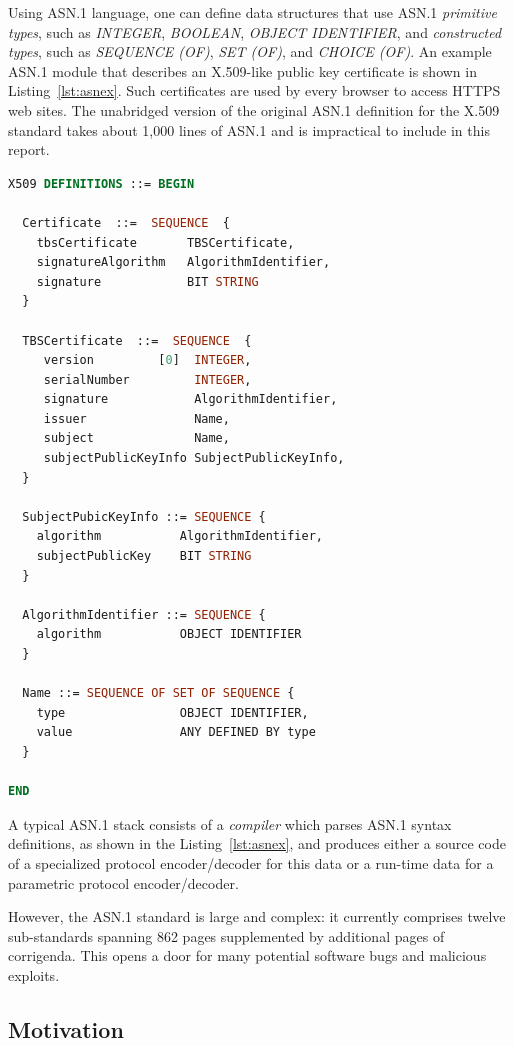 \documentclass[acmsmall,nonacm]{acmart}
\begin{document}
Using ASN.1 language, one can define data structures that use
ASN.1 {\it primitive types}, such as \emph{INTEGER}, \emph{BOOLEAN}, \emph{OBJECT
IDENTIFIER}, and {\it constructed types}, such as \emph{SEQUENCE (OF)},
\emph{SET (OF)}, and \emph{CHOICE (OF)}. An example ASN.1 module that describes an X.509-like public key
certificate is shown in Listing~\ref{lst:asnex}. Such certificates are
used by every browser to access HTTPS web sites. The unabridged
version of the original ASN.1 definition for the X.509 standard takes
about 1,000 lines of ASN.1 and is impractical to include in this
report. 

\begin{lstlisting}[language=ASN1,label=lst:asnex,
  caption={ASN.1 example of X.509 certificates, revised for brevity}]
X509 DEFINITIONS ::= BEGIN

  Certificate  ::=  SEQUENCE  {
    tbsCertificate       TBSCertificate,
    signatureAlgorithm   AlgorithmIdentifier,
    signature            BIT STRING
  }

  TBSCertificate  ::=  SEQUENCE  {
     version         [0]  INTEGER,
     serialNumber         INTEGER,
     signature            AlgorithmIdentifier,
     issuer               Name,
     subject              Name,
     subjectPublicKeyInfo SubjectPublicKeyInfo,
  }

  SubjectPubicKeyInfo ::= SEQUENCE {
    algorithm           AlgorithmIdentifier,
    subjectPublicKey    BIT STRING
  }

  AlgorithmIdentifier ::= SEQUENCE {
    algorithm           OBJECT IDENTIFIER
  }

  Name ::= SEQUENCE OF SET OF SEQUENCE {
    type                OBJECT IDENTIFIER,
    value               ANY DEFINED BY type
  }

END
\end{lstlisting}


A typical ASN.1 stack consists of a \textit{compiler} which parses
ASN.1 syntax definitions, as shown in the Listing~\ref{lst:asnex}, and
produces either a source code of a specialized protocol encoder/decoder for this data or a run-time data for a parametric protocol
encoder/decoder.

However, the ASN.1 standard is large and complex:
it currently comprises twelve sub-standards spanning 862 pages
supplemented by additional pages of corrigenda. This opens
a door for many potential software bugs and malicious exploits.
  
\subsection{Motivation}
\end{document}
